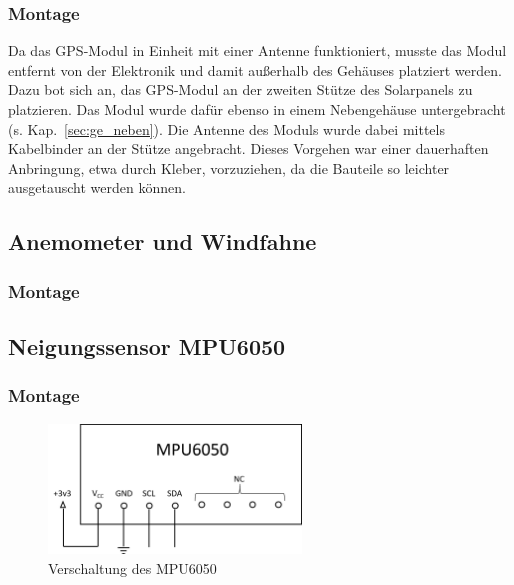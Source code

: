 \subsubsection{Montage}

Da das GPS-Modul in Einheit mit einer Antenne funktioniert, musste das Modul entfernt von der Elektronik und damit außerhalb des Gehäuses platziert werden. Dazu bot sich an, das GPS-Modul an der zweiten Stütze des Solarpanels zu platzieren. Das Modul wurde dafür ebenso in einem Nebengehäuse untergebracht (s. Kap.~\ref{sec:ge_neben}). Die Antenne des Moduls wurde dabei mittels Kabelbinder an der Stütze angebracht. Dieses Vorgehen war einer dauerhaften Anbringung, etwa durch Kleber, vorzuziehen, da die Bauteile so leichter ausgetauscht werden können.


\subsection{Anemometer und Windfahne}



\subsubsection{Montage}




\subsection{Neigungssensor MPU6050}


\subsubsection{Montage}

\begin{figure}[H]
  \centering
  \includegraphics[width=0.6\textwidth]{./img/MPU6050_Plan.png}
  \caption{Verschaltung des MPU6050}\label{fig:MPU6050_Plan}
\end{figure}


